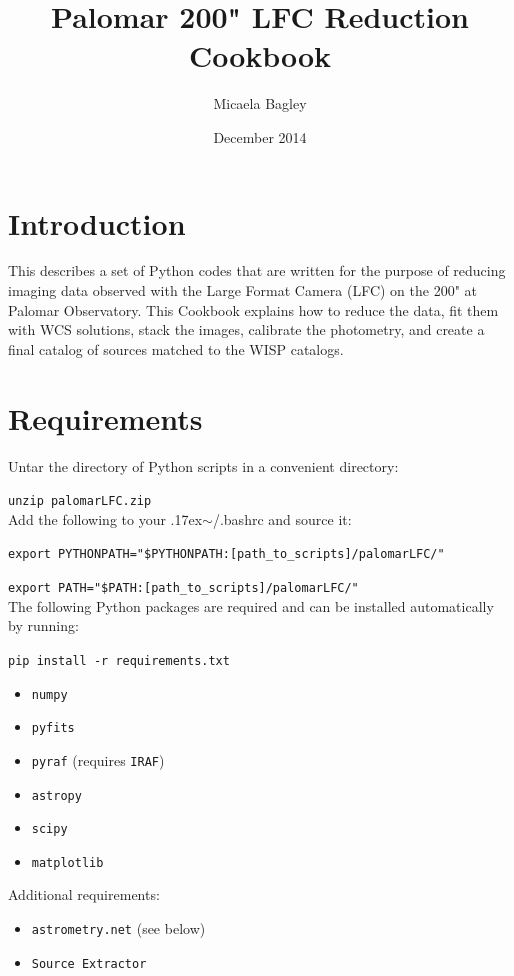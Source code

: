 \documentclass{article}
\title{Palomar 200" LFC Reduction Cookbook}
\author{Micaela Bagley}
\date{December 2014}
\newlength{\wideitemsep}
\let\olditem\item
\renewcommand{\item}{\setlength{\itemsep}{\wideitemsep}\olditem}
\newcommand{\ttsim}{\raise.17ex\hbox{$\scriptstyle\mathtt{\sim}$}}
\begin{document}
\maketitle

\section{Introduction}
This describes a set of Python codes that are written for the purpose 
of reducing imaging data observed with the Large Format Camera (LFC) on the 
200" at Palomar Observatory. This Cookbook explains how to reduce the data,
fit them with WCS solutions, stack the images, calibrate the photometry,
and create a final catalog of sources matched to the WISP catalogs.

\vspace{4 mm}
\section{Requirements}
Untar the directory of Python scripts in a convenient directory: 

\texttt{unzip palomarLFC.zip} \\
Add the following to your \ttsim/.bashrc and source it:

\texttt{export PYTHONPATH="\$PYTHONPATH:[path\_to\_scripts]/palomarLFC/"}

\texttt{export PATH="\$PATH:[path\_to\_scripts]/palomarLFC/"}\\

\noindent The following Python packages are required and can be installed 
automatically by running:

\texttt{pip install -r requirements.txt}
\begin{itemize}
\item \texttt{numpy}
\item \texttt{pyfits}
\item \texttt{pyraf} (requires \texttt{IRAF})
\item \texttt{astropy}
\item \texttt{scipy}
\item \texttt{matplotlib}
\end{itemize}

\noindent Additional requirements:
\begin{itemize}
\item \texttt{astrometry.net} (see below)
\item \texttt{Source Extractor}
\end{itemize}
\end{document}
